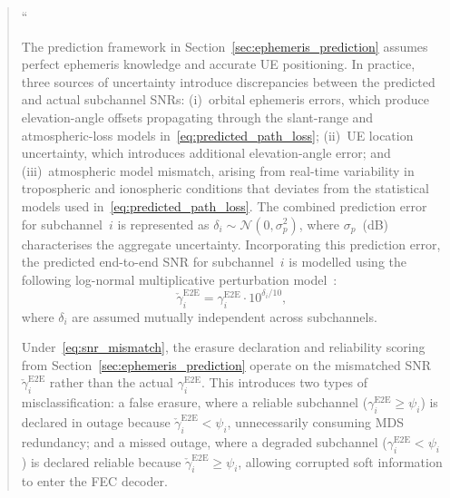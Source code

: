\begin{quote}
``{\color{blue}
The prediction framework in Section~\ref{sec:ephemeris_prediction}
assumes perfect ephemeris knowledge and accurate UE positioning.
In practice, three sources of uncertainty introduce discrepancies
between the predicted and actual subchannel SNRs:
(i)~orbital ephemeris errors, which produce elevation-angle
offsets propagating through the slant-range
and atmospheric-loss models in~\eqref{eq:predicted_path_loss};
(ii)~UE location uncertainty, which introduces additional
elevation-angle error; and
(iii)~atmospheric model mismatch, arising from real-time
variability in tropospheric and ionospheric conditions that
deviates from the statistical models used
in~\eqref{eq:predicted_path_loss}.  The combined prediction error for subchannel~$i$ is represented as $\delta_i \sim \mathcal{N}(0, \sigma_p^2)$, where $\sigma_p$~(dB) characterises the aggregate uncertainty. Incorporating this prediction error, the predicted end-to-end SNR for subchannel~$i$ is modelled using the following log-normal multiplicative perturbation model~\cite{Papoulis2002}:
\begin{equation*}
\check{\gamma}_i^{\mathrm{E2E}} =
\gamma_i^{\mathrm{E2E}} \cdot 10^{\delta_i/10},
\end{equation*}
where $\delta_i$ are assumed mutually independent across subchannels.

Under~\eqref{eq:snr_mismatch}, the erasure declaration and
reliability scoring from Section~\ref{sec:ephemeris_prediction}
operate on the mismatched SNR $\check{\gamma}_i^{\mathrm{E2E}}$
rather than the actual $\gamma_i^{\mathrm{E2E}}$.
This introduces two types of misclassification:
a false erasure, where a reliable subchannel
($\gamma_i^{\mathrm{E2E}} \geq \psi_i$) is declared in outage
because $\check{\gamma}_i^{\mathrm{E2E}} < \psi_i$,
unnecessarily consuming MDS redundancy;
and a missed outage, where a degraded subchannel
($\gamma_i^{\mathrm{E2E}} < \psi_i$) is declared reliable
because $\check{\gamma}_i^{\mathrm{E2E}} \geq \psi_i$,
allowing corrupted soft information to enter the FEC decoder.

}
\end{quote}
